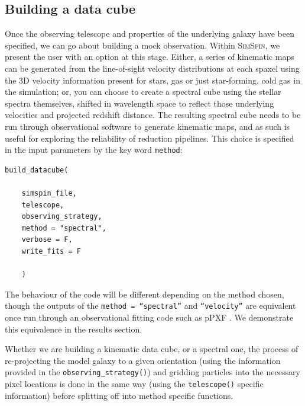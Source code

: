 \documentclass[
  journal=pasa,
  manuscript=research-paper, %
  year=2020,
  volume=37,
]{cup-journal}
\newcommand{\simspin}[1]{\textsc{SimSpin}#1} %
\newcommand{\telescope}[1]{\texttt{telescope()}#1}
\newcommand{\observingstrategy}[1]{\texttt{observing\_strategy()}#1}
\begin{document}
\subsection{Building a data cube}

Once the observing telescope and properties of the underlying galaxy have been specified, we can go about building a mock observation. 
Within \simspin, we present the user with an option at this stage. 
Either, a series of kinematic maps can be generated from the line-of-sight velocity distributions at each spaxel using the 3D velocity information present for stars, gas or just star-forming, cold gas in the simulation; or, you can choose to create a spectral cube using the stellar spectra themselves, shifted in wavelength space to reflect those underlying velocities and projected redshift distance. 
The resulting spectral cube needs to be run through observational software to generate kinematic maps, and as such is useful for exploring the reliability of reduction pipelines.
This choice is specified in the input parameters by the key word \texttt{method}:

\begin{lstlisting}[basicstyle=\fontsize{10}{8}\selectfont\ttfamily]
build_datacube(

    simspin_file,              
    telescope,           
    observing_strategy,  
    method = "spectral", 
    verbose = F, 
    write_fits = F
    
    )  
\end{lstlisting}

The behaviour of the code will be different depending on the method chosen, though the outputs of the \texttt{method = ``spectral''} and \texttt{``velocity''} are equivalent once run through an observational fitting code such as pPXF \citep{Cappellari2004ParametricLikelihood, Cappellari2017ImprovingFunctions}.
We demonstrate this equivalence in the results section. 

Whether we are building a kinematic data cube, or a spectral one, the process of re-projecting the model galaxy to a given orientation (using the information provided in the \observingstrategy) and gridding particles into the necessary pixel locations is done in the same way (using the \telescope{} specific information) before splitting off into method specific functions. 
\end{document}
